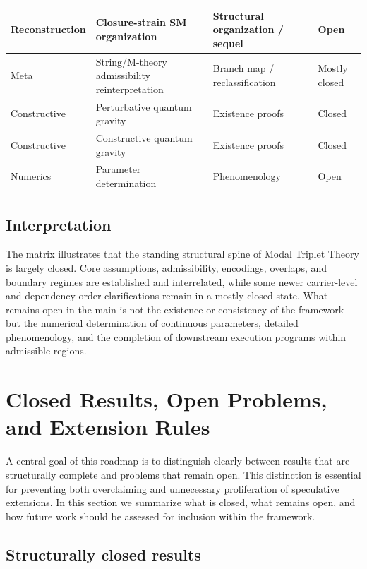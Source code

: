 \documentclass[11pt]{article}
\begin{document}
\begin{center}
\begin{tabular}{|l|l|l|l|}
\hline
Reconstruction & Closure-strain SM organization & Structural organization / sequel & Open \\
\hline
Meta & String/M-theory admissibility reinterpretation & Branch map / reclassification & Mostly closed \\
\hline
Constructive & Perturbative quantum gravity & Existence proofs & Closed \\
\hline
Constructive & Constructive quantum gravity & Existence proofs & Closed \\
\hline
Numerics & Parameter determination & Phenomenology & Open \\
\hline
\end{tabular}
\end{center}

\subsection{Interpretation}

The matrix illustrates that the standing structural spine of Modal Triplet Theory is largely closed. Core assumptions, admissibility, encodings, overlaps, and boundary regimes are established and interrelated, while some newer carrier-level and dependency-order clarifications remain in a mostly-closed state. What remains open in the main is not the existence or consistency of the framework but the numerical determination of continuous parameters, detailed phenomenology, and the completion of downstream execution programs within admissible regions.
\section{Closed Results, Open Problems, and Extension Rules}

A central goal of this roadmap is to distinguish clearly between results that are structurally complete and problems that remain open. This distinction is essential for preventing both overclaiming and unnecessary proliferation of speculative extensions. In this section we summarize what is closed, what remains open, and how future work should be assessed for inclusion within the framework.

\subsection{Structurally closed results}
\end{document}
